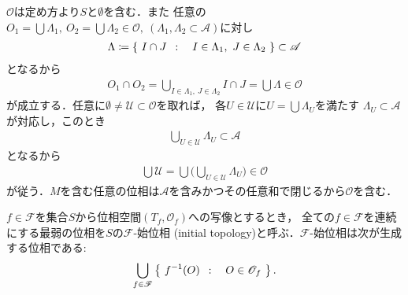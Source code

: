 	\begin{prf}
		$\mathscr{O}$は定め方より$S$と$\emptyset$を含む．また
		任意の$O_1 = \bigcup \Lambda_1,\ O_2=\bigcup \Lambda_2 \in \mathscr{O},\ 
		(\Lambda_1,\Lambda_2 \subset \mathscr{A})$に対し
		\begin{align}
			\Lambda \coloneqq
			\left\{\ I \cap J\ \, : \quad I \in \Lambda_1,\ J \in \Lambda_2\ \right\} \subset \mathscr{A}
		\end{align}
		となるから
		\begin{align}
			O_1 \cap O_2 = \bigcup_{I \in \Lambda_1,\ J \in \Lambda_2} I \cap J
			= \bigcup \Lambda \in \mathscr{O}
		\end{align}
		が成立する．任意に$\emptyset \neq \mathscr{U} \subset \mathscr{O}$を取れば，
		各$U \in \mathscr{U}$に$U = \bigcup \Lambda_U$を満たす
		$\Lambda_U \subset \mathscr{A}$が対応し，このとき
		\begin{align}
			\bigcup_{U \in \mathscr{U}} \Lambda_U \subset \mathscr{A}
		\end{align}
		となるから
		\begin{align}
			\bigcup \mathscr{U} = \bigcup \Biggl(\bigcup_{U \in \mathscr{U}} \Lambda_U\Biggr)
			\in \mathscr{O}
		\end{align}
		が従う．$M$を含む任意の位相は$\mathscr{A}$を含みかつその任意和で閉じるから$\mathscr{O}$を含む．
		\QED
	\end{prf}
	
	\begin{screen}
		\begin{dfn}[始位相]
			$f \in \mathscr{F}$を集合$S$から位相空間$(T_f,\mathscr{O}_f)$への写像とするとき，
			全ての$f \in \mathscr{F}$を連続にする最弱の位相を$S$の$\mathscr{F}$-始位相
			(initial topology)と呼ぶ．$\mathscr{F}$-始位相は次が生成する位相である:
			\begin{align}
				\bigcup_{f \in \mathscr{F}} \left\{\ f^{-1}(O)\ \, : \quad O \in \mathscr{O}_f\ \right\}.
			\end{align}
		\end{dfn}
	\end{screen}
	
